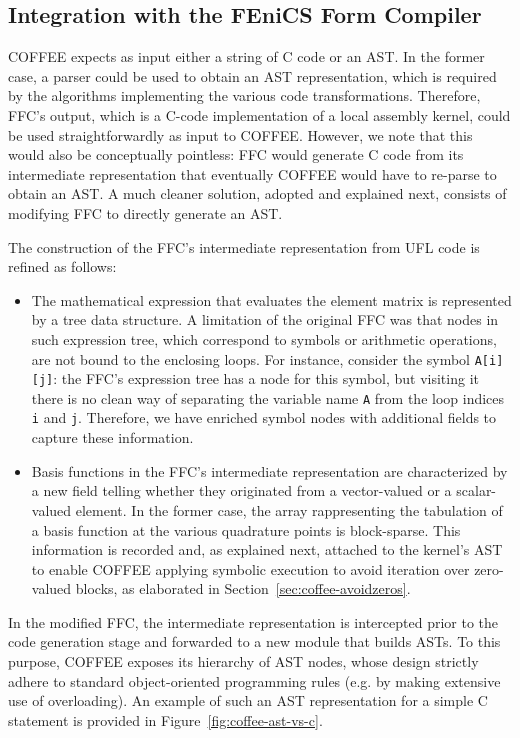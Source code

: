 \subsection{Integration with the FEniCS Form Compiler}
COFFEE expects as input either a string of C code or an AST. In the former case, a parser could be used to obtain an AST representation, which is required by the algorithms implementing the various code transformations. Therefore, FFC's output, which is a C-code implementation of a local assembly kernel, could be used straightforwardly as input to COFFEE. However, we note that this would also be conceptually pointless: FFC would generate C code from its intermediate representation that eventually COFFEE would have to re-parse to obtain an AST. A much cleaner solution, adopted and explained next, consists of modifying FFC to directly generate an AST. 

The construction of the FFC's intermediate representation from UFL code is refined as follows:
\begin{itemize}
\item The mathematical expression that evaluates the element matrix is represented by a tree data structure. A limitation of the original FFC was that nodes in such expression tree, which correspond to symbols or arithmetic operations, are not bound to the enclosing loops. For instance, consider the symbol \texttt{A[i][j]}: the FFC's expression tree has a node for this symbol, but visiting it there is no clean way of separating the variable name \texttt{A} from the loop indices \texttt{i} and \texttt{j}. Therefore, we have enriched symbol nodes with additional fields to capture these information. 
\item Basis functions in the FFC's intermediate representation are characterized by a new field telling whether they originated from a vector-valued or a scalar-valued element. In the former case, the array rappresenting the tabulation of a basis function at the various quadrature points is block-sparse. This information is recorded and, as explained next, attached to the kernel's AST to enable COFFEE applying symbolic execution to avoid iteration over zero-valued blocks, as elaborated in Section~\ref{sec:coffee-avoidzeros}.
\end{itemize}
In the modified FFC, the intermediate representation is intercepted prior to the code generation stage and forwarded to a new module that builds ASTs. To this purpose, COFFEE exposes its hierarchy of AST nodes, whose design strictly adhere to standard object-oriented programming rules (e.g. by making extensive use of overloading). An example of such an AST representation for a simple C statement is provided in Figure~\ref{fig:coffee-ast-vs-c}.

